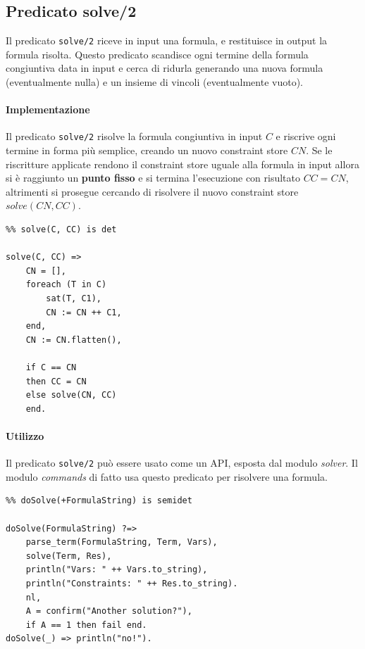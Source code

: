 \documentclass[12pt,a4paper,openright]{book} %
\begin{document}
\subsection{Predicato solve/2}
\label{subsec:lsetpicat_solver_solve2}

Il predicato \verb|solve/2| riceve in input una formula, e restituisce
in output la formula risolta. Questo predicato scandisce ogni termine
della formula congiuntiva data in input e cerca di ridurla generando
una nuova formula (eventualmente nulla) e un insieme di vincoli
(eventualmente vuoto).

\paragraph{Implementazione}

Il predicato \verb|solve/2| risolve la formula congiuntiva in input
$C$ e riscrive ogni termine in forma più semplice, creando un nuovo
constraint store $CN$. Se le riscritture applicate rendono il
constraint store uguale alla formula in input allora si è raggiunto un
\textbf{punto fisso} e si termina l'esecuzione con risultato $CC =
CN$, altrimenti si prosegue cercando di risolvere il nuovo constraint
store $solve(CN, CC)$.

\begin{verbatim}
%% solve(C, CC) is det

solve(C, CC) =>
    CN = [],
    foreach (T in C)
        sat(T, C1),
        CN := CN ++ C1,
    end,
    CN := CN.flatten(),

    if C == CN
    then CC = CN
    else solve(CN, CC)
    end.
\end{verbatim}

\paragraph{Utilizzo}
Il predicato \verb|solve/2| può essere usato come un API, esposta dal
modulo \emph{solver}. Il modulo \emph{commands} di fatto usa questo
predicato per risolvere una formula.
\begin{verbatim}
%% doSolve(+FormulaString) is semidet

doSolve(FormulaString) ?=>
    parse_term(FormulaString, Term, Vars),
    solve(Term, Res),
    println("Vars: " ++ Vars.to_string),
    println("Constraints: " ++ Res.to_string).
    nl,
    A = confirm("Another solution?"),
    if A == 1 then fail end.
doSolve(_) => println("no!").
\end{verbatim}
\end{document}
